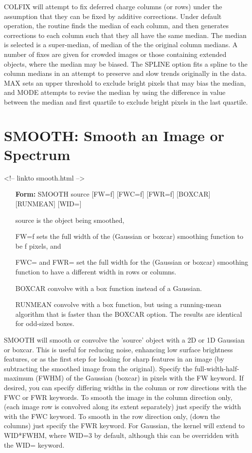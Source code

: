 COLFIX will attempt to fix deferred charge columns (or rows) under
the assumption that they can be fixed by additive corrections.  Under
default operation, the routine finds the median of each column, and then
generates corrections to each column such that they all have the same
median.  The median is selected is a super-median, of median of the the
original column medians.  A number of fixes are given for crowded images or
those containing extended objects, where the median may be biased.  The
SPLINE option fits a spline to the column medians in an attempt to preserve
and slow trends originally in the data.  MAX sets an upper threshold to
exclude bright pixels that may bias the median, and MODE attempts to revise
the median by using the difference in value between the median and first
quartile to exclude bright pixels in the last quartile.

\section{SMOOTH: Smooth an Image or Spectrum}
\begin{rawhtml}
<!-- linkto smooth.html -->
\end{rawhtml}

\begin{itemize}
  \item[\textbf{Form: }SMOOTH source {[FW=f]} {[FWC=f]} {[FWR=f]} 
       {[BOXCAR]} {[RUNMEAN]} {[WID=]}\hfill]{}
  \item[source]{is the object being smoothed,}
  \item[FW=f]{sets the full width of the (Gaussian or boxcar)
       smoothing function to be f pixels, and}
  \item[FWC= and FWR=]{set the full width for the (Gaussian or boxcar)
       smoothing function to have a different width in rows or columns.}
  \item[BOXCAR]{convolve with a box function instead of a Gaussian.}
  \item[RUNMEAN]{convolve with a box function, but using a
       running-mean algorithm that is faster than the BOXCAR option. 
       The results are identical for odd-sized boxes.}
\end{itemize}

SMOOTH will smooth or convolve the 'source' object with a 2D or 1D Gaussian
or boxcar.  This is useful for reducing noise, enhancing low surface
brightness features, or as the first step for looking for sharp features in
an image (by subtracting the smoothed image from the original).  Specify the
full-width-half-maximum (FWHM) of the Gaussian (boxcar) in pixels with the
FW keyword. If desired, you can specify differing widths in the column or
row directions with the FWC or FWR keywords.  To smooth the image in the
column direction only, (each image row is convolved along its extent
separately) just specify the width with the FWC keyword.  To smooth in the
row direction only, (down the columns) just specify the FWR keyword. For
Gaussian, the kernel will extend to WID*FWHM, where WID=3 by default,
although this can be overridden with the WID= keyword.

